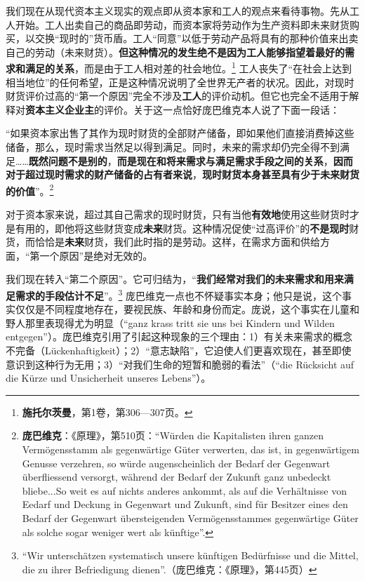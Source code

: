 \documentclass[fontset=fandol, a4paper, 12pt, openright]{ctexbook}
\begin{document}
我们现在从现代资本主义现实的观点即从资本家和工人的观点来看待事物。先从工人开始。工人出卖自己的商品即劳动，而资本家将劳动作为生产资料即未来财货购买，以交换“现时的”货币盾。工人“同意”以低于劳动产品将具有的那种价值来出卖自己的劳动（未来财货）。\textbf{但这种情况的发生绝不是因为工人能够指望着最好的需求和满足的关系}，而是由于工人相对差的社会地位。\footnote{\textbf{施托尔茨曼}，第1卷，第306—307页。} 工人丧失了“在社会上达到相当地位”的任何希望，正是这种情况说明了全世界无产者的状况。因此，对现时财货评价过高的“第一个原因”完全不涉及\textbf{工人}的评价动机。但它也完全不适用于解释对\textbf{资本主义企业主}的评价。关于这一点恰好庞巴维克本人说了下面一段话：

“如果资本家出售了其作为现时财货的全部财产储备，即如果他们直接消费掉这些储备，那么，现时需求当然足以得到满足。同时，未来的需求却仍完全得不到满足……\textbf{既然问题不是别的}，\textbf{而是现在和将来需求与满足需求手段之间的关系}，\textbf{因而对于超过现时需求的财产储备的占有者来说}，\textbf{现时财货本身甚至具有少于未来财货的价值}”。\footnote{\textbf{庞巴维克}：《原理》，第510页：“W\"{u}rden die Kapitalisten ihren ganzen Verm\"{o}gensstamm als gegenw\"{a}rtige G\"{u}ter verwerten, das ist, in gegenw\"{a}rtigem Genusse verzehren, so w\"{u}rde augenscheinlich der Bedarf der Gegenwart \"{u}berfliessend versorgt, w\"{a}hrend der Bedarf der Zukunft ganz unbedeckt bliebe...So weit es auf nichts anderes ankommt, als auf die Verh\"{a}ltnisse von Eedarf und Deckung in Gegenwart und Zukunft, sind f\"{u}r Besitzer eines den Bedarf der Gegenwart \"{u}bersteigenden Verm\"{o}gensstammes gegenw\"{a}rtige G\"{u}ter als solche sogar weniger wert als k\"{u}nftige”.}

对于资本家来说，超过其自己需求的现时财货，只有当他\textbf{有效地}使用这些财货时才是有用的，即他将这些财货变成\textbf{未来}财货。这种情况促使“过高评价”的\textbf{不是现时}财货，而恰恰是\textbf{未来}财货，我们此时指的是劳动。这样，在需求方面和供给方面，“第一个原因”是绝对无效的。

我们现在转入“第二个原因”。它可归结为，“\textbf{我们经常对我们的未来需求和用来满足需求的手段估计不足}”。\footnote{``Wir untersch\"{a}tzen systematisch unsere k\"{u}nftigen Bed\"{u}rfnisse und die Mittel, die zu ihrer Befriedigung dienen''.（庞巴维克：《原理》，第445页）} 庞巴维克一点也不怀疑事实本身；他只是说，这个事实仅仅是不同程度地存在，要视民族、年龄和身份而定。庞说，这个事实在儿童和野人那里表现得尤为明显（“ganz krass tritt sie uns bei Kindern und Wilden entgegen”）。庞巴维克引用了引起这种现象的三个理由：1）有关未来需求的概念不完备（Lückenhaftigkeit）；2）“意志缺陷”，它迫使人们更喜欢现在，甚至即使意识到这种行为无用；3）“对我们生命的短暂和脆弱的看法”（“die Rücksicht auf die Kürze und Unsicherheit unseres Lebens”）。
\end{document}
